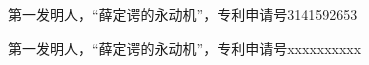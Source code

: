 \begin{patents}
	\item 第一发明人，“薛定谔的永动机”，专利申请号3141592653
\end{patents}

\begin{patents*}
	\item 第一发明人，“薛定谔的永动机”，专利申请号xxxxxxxxxx
\end{patents*}
